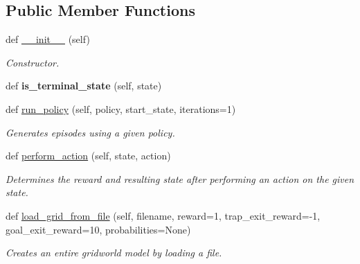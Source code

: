 \subsection*{Public Member Functions}
\begin{DoxyCompactItemize}
\item 
\mbox{\label{classsrc_1_1worlds_1_1grid__world_1_1_grid_world_afe3c1b392afbc00fb9a76c14a6e07899}} 
def \hyperlink{classsrc_1_1worlds_1_1grid__world_1_1_grid_world_afe3c1b392afbc00fb9a76c14a6e07899}{\+\_\+\+\_\+init\+\_\+\+\_\+} (self)
\begin{DoxyCompactList}\small\item\em Constructor. \end{DoxyCompactList}\item 
\mbox{\label{classsrc_1_1worlds_1_1grid__world_1_1_grid_world_a99e2c85924fd138eb2ee698e29ad1d09}} 
def {\bfseries is\+\_\+terminal\+\_\+state} (self, state)
\item 
def \hyperlink{classsrc_1_1worlds_1_1grid__world_1_1_grid_world_acfc919972f8a9c974baa36134ee980a0}{run\+\_\+policy} (self, policy, start\+\_\+state, iterations=1)
\begin{DoxyCompactList}\small\item\em Generates episodes using a given policy. \end{DoxyCompactList}\item 
def \hyperlink{classsrc_1_1worlds_1_1grid__world_1_1_grid_world_a93de8a88475e8ad0530fe703343028c9}{perform\+\_\+action} (self, state, action)
\begin{DoxyCompactList}\small\item\em Determines the reward and resulting state after performing an action on the given state. \end{DoxyCompactList}\item 
def \hyperlink{classsrc_1_1worlds_1_1grid__world_1_1_grid_world_a0d325c5372f0c9c5d98f17e896fb0d5f}{load\+\_\+grid\+\_\+from\+\_\+file} (self, filename, reward=1, trap\+\_\+exit\+\_\+reward=-\/1, goal\+\_\+exit\+\_\+reward=10, probabilities=None)
\begin{DoxyCompactList}\small\item\em Creates an entire gridworld model by loading a file. \end{DoxyCompactList}\end{DoxyCompactItemize}
